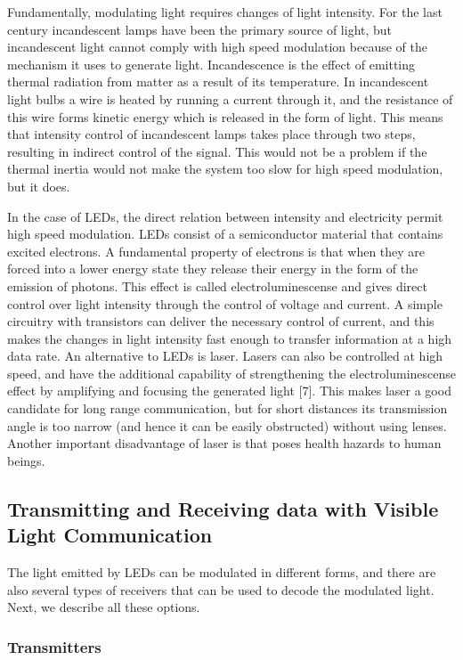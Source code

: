 Fundamentally, modulating light requires changes of light intensity. For the last
century incandescent lamps have been the primary source of light, but incandescent
light cannot comply with high speed modulation because of the mechanism
it uses to generate light. Incandescence is the effect of emitting thermal radiation
from matter as a result of its temperature. In incandescent light bulbs a wire is
heated by running a current through it, and the resistance of this wire forms kinetic energy which is released in the form of light. This means that intensity control
of incandescent lamps takes place through two steps, resulting in indirect control
of the signal. This would not be a problem if the thermal inertia would not make
the system too slow for high speed modulation, but it does.

In the case of LEDs, the direct relation between intensity and electricity permit
high speed modulation. LEDs consist of a semiconductor material that contains
excited electrons. A fundamental property of electrons is that when they are
forced into a lower energy state they release their energy in the form of the emission
of photons. This effect is called electroluminescense and gives direct control
over light intensity through the control of voltage and current. A simple circuitry
with transistors can deliver the necessary control of current, and this makes the
changes in light intensity fast enough to transfer information at a high data rate.
An alternative to LEDs is laser. Lasers can also be controlled at high speed, and
have the additional capability of strengthening the electroluminescense effect by
amplifying and focusing the generated light [7]. This makes laser a good candidate
for long range communication, but for short distances its transmission angle is too
narrow (and hence it can be easily obstructed) without using lenses. Another
important disadvantage of laser is that poses health hazards to human beings.

\subsection{Transmitting and Receiving data with Visible Light
Communication}

The light emitted by LEDs can be modulated in different forms, and there are also
several types of receivers that can be used to decode the modulated light. Next,
we describe all these options.

\subsubsection{Transmitters}

